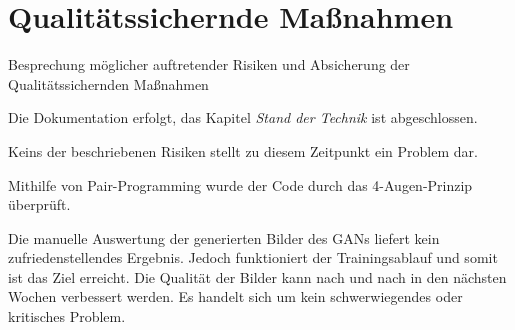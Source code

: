 \section{Qualitätssichernde Maßnahmen}
Besprechung möglicher auftretender Risiken und Absicherung der Qualitätssichernden Maßnahmen
\begin{description}[style=nextline]
	\item[Review und Dokumentation \hfill \fullcheck]
	Die Dokumentation erfolgt, das Kapitel \textit{Stand der Technik} ist abgeschlossen.
	
	\item[Risikoanalyse \hfill \fullcheck]
	Keins der beschriebenen Risiken stellt zu diesem Zeitpunkt ein Problem dar.
	
	\item[Pair-Programming \hfill \fullcheck]
	Mithilfe von Pair-Programming wurde der Code durch das 4-Augen-Prinzip überprüft.
	
	\item[Tests/Kontrollen \hfill \fullcheck]
	Die manuelle Auswertung der generierten Bilder des GANs liefert kein zufriedenstellendes Ergebnis.
	Jedoch funktioniert der Trainingsablauf und somit ist das Ziel erreicht.
	Die Qualität der Bilder kann nach und nach in den nächsten Wochen verbessert werden.
	Es handelt sich um kein schwerwiegendes oder kritisches Problem.
	
\end{description}

